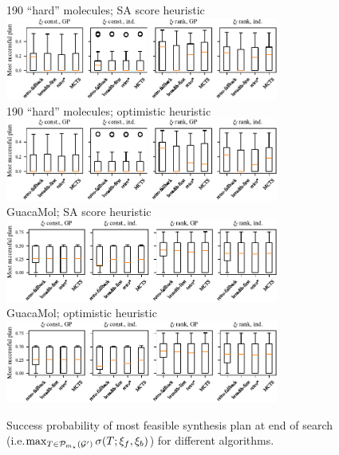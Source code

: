 \begin{figure}[htb]
    \centering
    {190 ``hard'' molecules; SA score heuristic} \\
    \vspace{0.3cm}
    \includegraphics[width=0.8\textwidth]{figures/comparison/retrostar190/most_feasible_sascore.pdf} \\
    \vspace{0.3cm}
    {190 ``hard'' molecules; optimistic heuristic} \\
    \vspace{0.3cm}
    \includegraphics[width=0.8\textwidth]{figures/comparison/retrostar190/most_feasible_optimistic.pdf} \\
    \vspace{0.3cm}
    {GuacaMol; SA score heuristic} \\
    \vspace{0.3cm}
    \includegraphics[width=0.8\textwidth]{figures/comparison/guacamol/most_feasible_sascore.pdf} \\
    \vspace{0.3cm}
    {GuacaMol; optimistic heuristic} \\
    \vspace{0.3cm}
    \includegraphics[width=0.8\textwidth]{figures/comparison/guacamol/most_feasible_optimistic.pdf}
    \caption[Success probability of most feasible synthesis plan.]{
        Success probability of most feasible synthesis plan
        at end of search
        (i.e.\@ $\max_{T\in\mathcal{P}_{m_\star}({\mathcal{G}}')}\sigma(T;\xi_f,\xi_b)$)
        for different algorithms.
    }
    \label{fig:most-feasible-route}
\end{figure}
